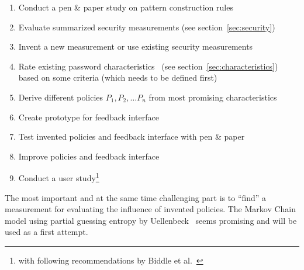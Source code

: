 \documentclass[twocolumn, a4paper, 10pt]{article}
\begin{document}
\begin{enumerate}
	\setlength\itemsep{0em}
	\item Conduct a pen \& paper study on pattern construction rules
	\item Evaluate summarized security measurements (see section~\ref{sec:security})
	\item Invent a new measurement or use existing security measurements
	\item Rate existing password characteristics~ (see section~\ref{sec:characteristics}) based on some criteria (which needs to be defined first)
	\item Derive different policies $P_1, P_2, \dots P_n$ from most promising characteristics
	\item Create prototype for feedback interface
	\item Test invented policies and feedback interface with pen \& paper
	\item Improve policies and feedback interface
	\item Conduct a user study\footnote{with following recommendations by Biddle et al.~\cite{Biddle:2012:GPL:2333112.2333114}}
\end{enumerate}

The most important and at the same time challenging part is to ``find'' a measurement for evaluating the influence of invented policies. The Markov Chain model using partial guessing entropy by Uellenbeck~\cite{Uellenbeck:2013:QSG:2508859.2516700} seems promising and will be used as a first attempt.

{
	
	
}

\appendix
\end{document}
